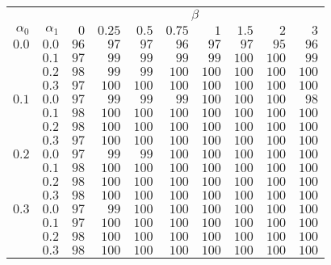 \begin{tabular}{rr|rrrrrrrr}
\hline\hline
 && \multicolumn{8}{c}{$\beta$}\\
 $\alpha_0$ & $\alpha_1$ & $0$ & $0.25$ & $0.5$ & $0.75$ & $1$ & $1.5$ & $2$ & $3$ \\ 
 \hline
$0.0$ & $0.0$ & $96$ & $97$ & $97$ & $96$ & $97$ & $97$ & $95$ & $96$\\ 
 & $0.1$ & $97$ & $99$ & $99$ & $99$ & $99$ & $100$ & $100$ & $99$\\ 
 & $0.2$ & $98$ & $99$ & $99$ & $100$ & $100$ & $100$ & $100$ & $100$\\ 
 & $0.3$ & $97$ & $100$ & $100$ & $100$ & $100$ & $100$ & $100$ & $100$\\ 
\hline 
 $0.1$ & $0.0$ & $97$ & $99$ & $99$ & $99$ & $100$ & $100$ & $100$ & $98$\\ 
 & $0.1$ & $98$ & $100$ & $100$ & $100$ & $100$ & $100$ & $100$ & $100$\\ 
 & $0.2$ & $98$ & $100$ & $100$ & $100$ & $100$ & $100$ & $100$ & $100$\\ 
 & $0.3$ & $97$ & $100$ & $100$ & $100$ & $100$ & $100$ & $100$ & $100$\\ 
\hline 
 $0.2$ & $0.0$ & $97$ & $99$ & $99$ & $100$ & $100$ & $100$ & $100$ & $100$\\ 
 & $0.1$ & $98$ & $100$ & $100$ & $100$ & $100$ & $100$ & $100$ & $100$\\ 
 & $0.2$ & $98$ & $100$ & $100$ & $100$ & $100$ & $100$ & $100$ & $100$\\ 
 & $0.3$ & $98$ & $100$ & $100$ & $100$ & $100$ & $100$ & $100$ & $100$\\ 
\hline 
 $0.3$ & $0.0$ & $97$ & $99$ & $100$ & $100$ & $100$ & $100$ & $100$ & $100$\\ 
 & $0.1$ & $97$ & $100$ & $100$ & $100$ & $100$ & $100$ & $100$ & $100$\\ 
 & $0.2$ & $98$ & $100$ & $100$ & $100$ & $100$ & $100$ & $100$ & $100$\\ 
 & $0.3$ & $98$ & $100$ & $100$ & $100$ & $100$ & $100$ & $100$ & $100$\\ 
 \hline 
 \end{tabular}